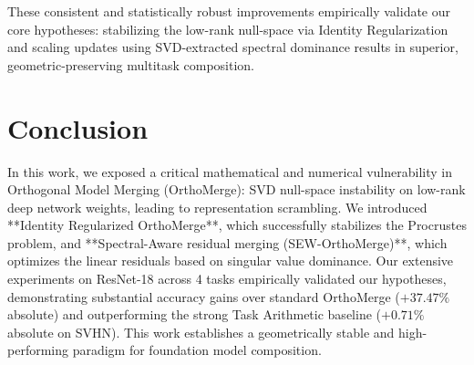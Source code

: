 \documentclass{article}
\theoremstyle{plain}
\theoremstyle{definition}
\theoremstyle{remark}
\begin{document}
These consistent and statistically robust improvements empirically validate our core hypotheses: stabilizing the low-rank null-space via Identity Regularization and scaling updates using SVD-extracted spectral dominance results in superior, geometric-preserving multitask composition.

\section{Conclusion}
\label{sec:conclusion}

In this work, we exposed a critical mathematical and numerical vulnerability in Orthogonal Model Merging (OrthoMerge): SVD null-space instability on low-rank deep network weights, leading to representation scrambling. We introduced **Identity Regularized OrthoMerge**, which successfully stabilizes the Procrustes problem, and **Spectral-Aware residual merging (SEW-OrthoMerge)**, which optimizes the linear residuals based on singular value dominance. Our extensive experiments on ResNet-18 across 4 tasks empirically validated our hypotheses, demonstrating substantial accuracy gains over standard OrthoMerge ($+37.47\%$ absolute) and outperforming the strong Task Arithmetic baseline ($+0.71\%$ absolute on SVHN). This work establishes a geometrically stable and high-performing paradigm for foundation model composition.



\end{document}
